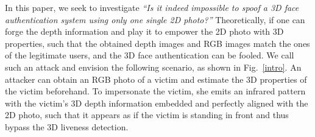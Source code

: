 In this paper, we seek to investigate \emph{``Is it indeed impossible to spoof a 3D face authentication system using only one single 2D photo?''} Theoretically, if one can forge the depth information and play it to empower the 2D photo with 3D properties, such that the obtained depth images and RGB images match the ones of the legitimate users, and the 3D face authentication can be fooled. %
We call such an attack \alias and envision the following scenario, as shown in Fig.~\ref{intro}. An attacker can obtain an RGB photo of a victim and estimate the 3D properties of the victim beforehand. To impersonate the victim, she emits an infrared pattern with the victim's 3D depth information embedded and perfectly aligned with the 2D photo, such that it appears as if the victim is standing in front and thus bypass the 3D liveness detection.



